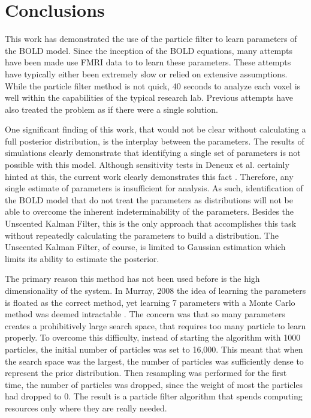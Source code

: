 \chapter{Conclusions}
\label{sec:Conclusion}
This work has demonstrated the use of the particle filter to
learn parameters of the BOLD model. Since the inception of the
BOLD equations, many attempts have been made use FMRI data to 
to learn these parameters. These attempts have typically either been extremely 
slow or relied on extensive assumptions. While the particle filter method
is not quick, 40 seconds to analyze each voxel is well within the capabilities
of the typical research lab. Previous attempts have also treated
the problem as if there were a single solution.

One significant finding of this work, that would not be clear without 
calculating a full posterior distribution, is the interplay 
between the parameters. The results of simulations clearly demonstrate
that identifying a single set of parameters is not possible with this 
model. Although sensitivity tests in Deneux et al. certainly hinted
at this, the current work clearly demonstrates this fact \cite{Deneux2006}. Therefore,
any single estimate of parameters is insufficient for analysis. As such,
identification of the BOLD model that do not treat the parameters as distributions
will not be able to overcome the inherent indeterminability of the
parameters. Besides the Unscented Kalman Filter, this is the only approach
that accomplishes this task without repeatedly calculating the parameters 
to build a distribution. The Unscented Kalman Filter, of course, is limited
to Gaussian estimation which limits its ability to estimate the posterior. 

The primary reason this method has not been used before is the high 
dimensionality of the system. In Murray, 2008 the idea of learning
the parameters is floated as the correct method, yet 
learning 7 parameters with a Monte Carlo method was deemed intractable
\cite{Murray2008}. The 
concern was that so many parameters creates a prohibitively large 
search space, that requires too many particle to learn properly. To overcome
this difficulty, instead of starting the algorithm with 1000 particles,
the initial number of particles was set to 16,000. This meant that
when the search space was the largest, the number of particles was
sufficiently dense to represent the prior distribution. Then resampling
was performed for the first time, the number of particles was dropped, 
since the weight of most the particles had dropped to 0. The result is
a particle filter algorithm that spends computing resources only where
they are really needed.

